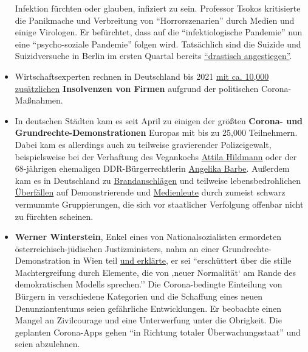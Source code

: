 \begin{itemize}
  Infektion fürchten oder glauben, infiziert zu sein. Professor Tsokos
  kritisierte die Panikmache und Verbreitung von ``Horrorszenarien''
  durch Medien und einige Virologen. Er befürchtet, dass auf die
  ``infektiologische Pandemie'' nun eine ``psycho-soziale Pandemie''
  folgen wird. Tatsächlich sind die Suizide und Suizidversuche in Berlin
  im ersten Quartal bereits
  \href{https://www.tichyseinblick.de/daili-es-sentials/suizide-in-berlin-steigen-im-ersten-quartal-drastisch/}{``drastisch
  angestiegen''}.
\item
  Wirtschaftsexperten rechnen in Deutschland bis 2021
  \href{https://www.focus.de/finanzen/news/konjunktur/insgesamt-fast-30-000-insolvenzen-in-deutschland-experten-geben-erste-schaetzung-ab-corona-treibt-10-000-deutsche-firmen-in-die-pleite_id_12003269.html}{mit
  ca. 10,000 zusätzlichen} \textbf{Insolvenzen von Firmen} aufgrund der
  politischen Corona-Maßnahmen.
\item
  In deutschen Städten kam es seit April zu einigen der größten
  \textbf{Corona- und Grundrechte-Demonstrationen} Europas mit bis zu
  25,000 Teilnehmern. Dabei kam es allerdings auch zu teilweise
  gravierender Polizeigewalt, beispielsweise bei der Verhaftung des
  Vegankochs \href{https://www.youtube.com/watch?v=20HIEEQtyZ8}{Attila
  Hildmann} oder der 68-jährigen ehemaligen DDR-Bürgerrechtlerin
  \href{https://www.youtube.com/watch?v=fCbgVFRCnTc}{Angelika Barbe}.
  Außerdem kam es in Deutschland zu
  \href{https://www.swr.de/swraktuell/baden-wuerttemberg/spreng-anschlag-100.html}{Brandanschlägen}
  und teilweise lebensbedrohlichen
  \href{https://www.swr.de/swraktuell/baden-wuerttemberg/stuttgart/corona-demo-in-stuttgart-ermittlungen-wegen-versuchter-toetung-100.html}{Überfällen}
  auf Demonstrierende und
  \href{https://kenfm.de/anschlagsversuch-auf-ken-jebsen-tagesdosis-9-6-2020/}{Medienleute}
  durch zumeist schwarz vermummte Gruppierungen, die sich vor
  staatlicher Verfolgung offenbar nicht zu fürchten scheinen.
\item
  \textbf{Werner Winterstein}, Enkel eines von Nationalsozialisten
  ermordeten österreichisch-jüdischen Justizministers, nahm an einer
  Grundrechte-Demonstration in Wien teil
  \href{https://vimeo.com/418039066}{und erklärte}, er sei ``erschüttert
  über die stille Machtergreifung durch Elemente, die von ‚neuer
  Normalität` am Rande des demokratischen Modells sprechen.'' Die
  Corona-bedingte Einteilung von Bürgern in verschiedene Kategorien und
  die Schaffung eines neuen Denunziantentums seien gefährliche
  Entwicklungen. Er beobachte einen Mangel an Zivilcourage und eine
  Unterwerfung unter die Obrigkeit. Die geplanten Corona-Apps gehen ``in
  Richtung totaler Überwachungsstaat'' und seien abzulehnen.
\end{itemize}

